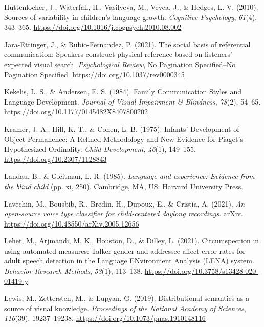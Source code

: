 \documentclass[
  man,floatsintext]{apa6}
\newlength{\cslhangindent}
\newlength{\cslentryspacingunit} %
\newenvironment{CSLReferences}[2] %
 {%
  \setlength{\parindent}{0pt}
  \ifodd #1
  \let\oldpar\par
  \def\par{\hangindent=\cslhangindent\oldpar}
  \fi
  \setlength{\parskip}{#2\cslentryspacingunit}
 }%
 {}
\begin{document}
\begin{CSLReferences}{1}{0}
\leavevmode{}%
Huttenlocher, J., Waterfall, H., Vasilyeva, M., Vevea, J., \& Hedges, L. V. (2010). Sources of variability in children's language growth. \emph{Cognitive Psychology}, \emph{61}(4), 343--365. \url{https://doi.org/10.1016/j.cogpsych.2010.08.002}

\leavevmode{}%
Jara-Ettinger, J., \& Rubio-Fernandez, P. (2021). The social basis of referential communication: {Speakers} construct physical reference based on listeners' expected visual search. \emph{Psychological Review}, No Pagination Specified--No Pagination Specified. \url{https://doi.org/10.1037/rev0000345}

\leavevmode{}%
Kekelis, L. S., \& Andersen, E. S. (1984). Family {Communication Styles} and {Language Development}. \emph{Journal of Visual Impairment \& Blindness}, \emph{78}(2), 54--65. \url{https://doi.org/10.1177/0145482X8407800202}

\leavevmode{}%
Kramer, J. A., Hill, K. T., \& Cohen, L. B. (1975). Infants' {Development} of {Object Permanence}: {A Refined Methodology} and {New Evidence} for {Piaget}'s {Hypothesized Ordinality}. \emph{Child Development}, \emph{46}(1), 149--155. \url{https://doi.org/10.2307/1128843}

\leavevmode{}%
Landau, B., \& Gleitman, L. R. (1985). \emph{Language and experience: {Evidence} from the blind child} (pp. xi, 250). Cambridge, MA, US: Harvard University Press.

\leavevmode{}%
Lavechin, M., Bousbib, R., Bredin, H., Dupoux, E., \& Cristia, A. (2021). \emph{An open-source voice type classifier for child-centered daylong recordings}. arXiv. \url{https://doi.org/10.48550/arXiv.2005.12656}

\leavevmode{}%
Lehet, M., Arjmandi, M. K., Houston, D., \& Dilley, L. (2021). Circumspection in using automated measures: {Talker} gender and addressee affect error rates for adult speech detection in the {Language ENvironment Analysis} ({LENA}) system. \emph{Behavior Research Methods}, \emph{53}(1), 113--138. \url{https://doi.org/10.3758/s13428-020-01419-y}

\leavevmode{}%
Lewis, M., Zettersten, M., \& Lupyan, G. (2019). Distributional semantics as a source of visual knowledge. \emph{Proceedings of the National Academy of Sciences}, \emph{116}(39), 19237--19238. \url{https://doi.org/10.1073/pnas.1910148116}


\end{CSLReferences}
\end{document}
